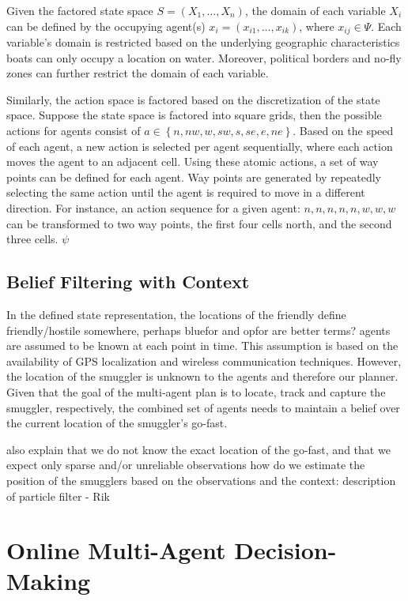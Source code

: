 \documentclass[conference]{IEEEtran}
\begin{document}
Given the factored state space $S = \left(X_1,\ldots,X_n\right)$, the domain of each variable $X_i$ can be defined by the occupying agent(s) \ie $x_i=\left(x_{i1},\ldots,x_{ik}\right)$, where $x_{ij}\in\Psi$. Each variable's domain is restricted based on the underlying geographic characteristics \ie boats can only occupy a location on water. Moreover, political borders and no-fly zones can further restrict the domain of each variable.

Similarly, the action space is factored based on the discretization of the state space. Suppose the state space is factored into square grids, then the possible actions for agents consist of $a\in\left\{n, nw, w, sw, s, se, e, ne\right\}$. Based on the speed of each agent, a new action is selected per agent sequentially, where each action moves the agent to an adjacent cell. Using these atomic actions, a set of way points can be defined for each agent. Way points are generated by repeatedly selecting the same action until the agent is required to move in a different direction. For instance, an action sequence for a given agent: $n, n, n, n, n, w, w, w$ can be transformed to two way points, the first four cells north, and the second three cells.  $\psi$

\subsection{Belief Filtering with Context}

In the defined state representation, the locations of the friendly {\red define friendly/hostile somewhere, perhaps bluefor and opfor are better terms?} agents are assumed to be known at each point in time. This assumption is based on the availability of GPS localization and wireless communication techniques. However, the location of the smuggler is unknown to the agents and therefore our planner. Given that the goal of the multi-agent plan is to locate, track and capture the smuggler, respectively, the combined set of agents needs to maintain a belief over the current location of the smuggler's go-fast.

{\red also explain that we do not know the exact location of the go-fast, and that we expect only sparse and/or unreliable observations}
{\red how do we estimate the position of the smugglers based on the observations and the context: description of particle filter - Rik}

\section{Online Multi-Agent Decision-Making}
\label{sec:ma-dec-mak}
\end{document}
